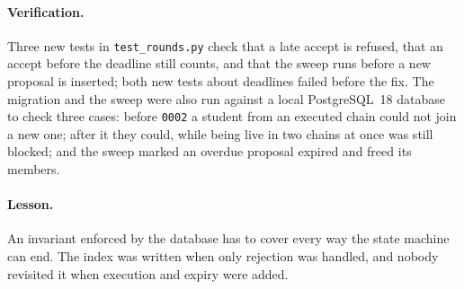 \paragraph{Verification.} Three new tests in \texttt{test\_rounds.py}
check that a late accept is refused, that an accept before the deadline
still counts, and that the sweep runs before a new proposal is
inserted; both new tests about deadlines failed before the fix. The
migration and the sweep were also run against a local PostgreSQL~18
database to check three cases: before \texttt{0002} a student from an
executed chain could not join a new one; after it they could, while
being live in two chains at once was still blocked; and the sweep marked
an overdue proposal expired and freed its members.

\paragraph{Lesson.} An invariant enforced by the database has to cover
every way the state machine can end. The index was written when only
rejection was handled, and nobody revisited it when execution and expiry
were added.
